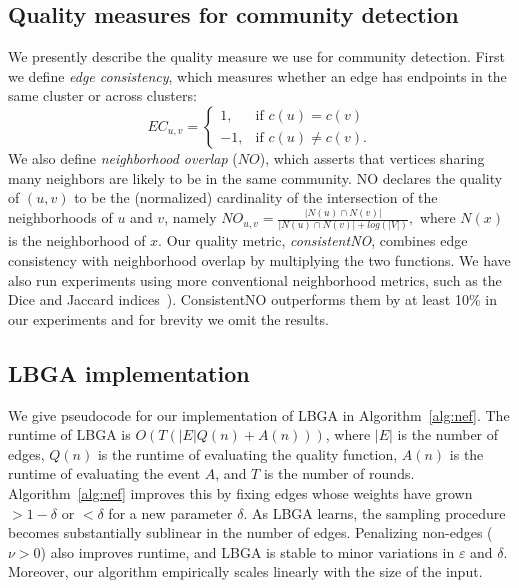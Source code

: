 \documentclass{article}
\begin{document}
 \subsection{Quality measures for community detection}
\label{sec:quality-measures}
We presently describe the quality measure we use for community detection. First
we define {\em edge consistency}, which measures whether an edge has endpoints
in the same cluster or across clusters:
\[
   EC_{u,v}=
   \begin{cases}
   1, & \text{if  }c(u) = c(v) \\
   -1,  & \text{if  }c(u) \neq c(v).
   \end{cases}
\]
We also define \emph{neighborhood overlap} ($NO$), which asserts that vertices
sharing many neighbors are likely to be in the same community. NO declares the
quality of $(u,v)$ to be the (normalized) cardinality of the intersection of
the neighborhoods of $u$ and $v$, namely $NO_{u,v}=\frac{|N(u) \cap
N(v)|}{|N(u) \cap N(v)| + log(|V|)},$ where $N(x)$ is the neighborhood of $x$.
Our quality metric, \emph{consistentNO}, combines edge consistency with
neighborhood overlap by multiplying the two functions. We have also run
experiments using more conventional neighborhood metrics, such as the Dice and
Jaccard indices~\cite{Dice1945}). ConsistentNO outperforms them by
at least 10\% in our experiments and for brevity we omit the results. 

\subsection{LBGA implementation} 
We give pseudocode for our implementation of LBGA in Algorithm~\ref{alg:nef}.
The runtime of LBGA is $O(T(|E| Q(n) + A(n)))$, where $|E|$ is the number of
edges, $Q(n)$ is the runtime of evaluating the quality function, $A(n)$ is the
runtime of evaluating the event $A$, and $T$ is the number of rounds.
Algorithm~\ref{alg:nef} improves this by fixing edges whose weights have grown
$ > 1-\delta$ or $< \delta$ for a new parameter $\delta$. As LBGA learns, the
sampling procedure becomes substantially sublinear in the number of edges.
Penalizing non-edges ($\nu > 0$) also improves runtime, and LBGA is stable to
minor variations in $\varepsilon$ and $\delta$. Moreover, our algorithm
empirically scales linearly with the size of the input.
\end{document}
